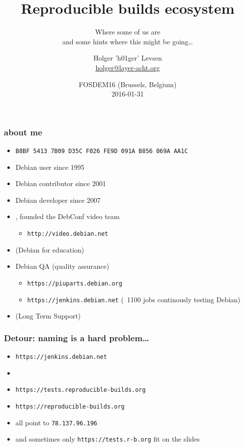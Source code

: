 \documentclass[14pt]{beamer}
\title[Reproducible builds ecosystem]{Reproducible builds ecosystem}
\subtitle{Where some of us are \\
and some hints where this might be going…}
\author[Holger 'h01ger' Levsen]{%
   \texorpdfstring{
            \centering
            Holger 'h01ger' Levsen\\
            \href{mailto:holger@layer-acht.org}{holger@layer-acht.org}
   }{h01ger}}
\institute[Debian]{}
\date[FOSDEM16]{%
 FOSDEM16 (Brussels, Belgium)\\
 \small{2016-01-31}}
\begin{document}
\begin{frame}[plain]
 \titlepage
\end{frame}

\begin{frame}
 \frametitle{about me}

 \begin{itemize}
  \item \small{\texttt{B8BF 5413 7B09 D35C F026  FE9D 091A B856 069A AA1C}}
  \item Debian user since 1995
  \item Debian contributor since 2001
  \item Debian developer since 2007
  \item {},
  founded the DebConf video team
   \begin{itemize}
    \item \texttt{http://video.debian.net}
   \end{itemize}
 \item {} (Debian for education)
  \item Debian QA (quality assurance)
  \begin{itemize}
   \item \texttt{https://piuparts.debian.org}
   \item \texttt{https://jenkins.debian.net} (~1100 jobs continously testing Debian)
  \end{itemize}
  \item {} (Long Term Support)
 \end{itemize}
\end{frame}

\begin{frame}
 \frametitle{Detour: naming is a hard problem…}
 \begin{itemize}
 \item \texttt{https://jenkins.debian.net}
 \item {}
 \item \texttt{https://tests.reproducible-builds.org}
 \item \texttt{https://reproducible-builds.org}
 \item<2-3> all point to \texttt{78.137.96.196}
 \item<3> \small{and sometimes only \texttt{https://tests.r-b.org} fit on the slides}
 \end{itemize}
\end{frame}
\end{document}
